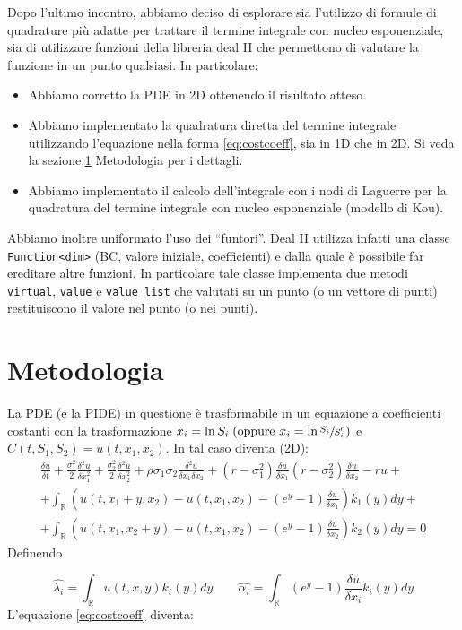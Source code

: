 \documentclass[a4paper,10pt]{article}
\newcommand{\der}[2]{\frac{\delta #1}{\delta #2}}
\newcommand{\dder}[2]{\frac{\delta^2 #1}{\delta #2^2}}
\newcommand{\dmix}[3]{\frac{\delta^2 #1}{\delta #2 \delta #3}}
\begin{document}
Dopo l'ultimo incontro, abbiamo deciso di esplorare sia l'utilizzo di formule di quadrature più adatte per trattare il termine integrale con nucleo esponenziale, sia di utilizzare funzioni della libreria deal II che permettono di valutare la funzione in un punto qualsiasi. In particolare:

\begin{itemize}
 \item Abbiamo corretto la PDE in 2D ottenendo il risultato atteso.
 \item Abbiamo implementato la quadratura diretta del termine integrale utilizzando l'equazione nella forma \eqref{eq:costcoeff}, sia in 1D che in 2D. Si veda la sezione \ref{sec:metod} Metodologia per i dettagli.
 \item Abbiamo implementato il calcolo dell'integrale con i nodi di Laguerre per la quadratura del termine integrale con nucleo esponenziale (modello di Kou).
\end{itemize}

Abbiamo inoltre uniformato l'uso dei ``funtori''. Deal II utilizza infatti una classe \verb!Function<dim>! (BC, valore iniziale, coefficienti) e dalla quale è possibile far ereditare altre funzioni. In particolare tale classe implementa due metodi \verb!virtual!, \verb!value! e \verb!value_list! che valutati su un punto (o un vettore di punti) restituiscono il valore nel punto (o nei punti). 

\section{Metodologia}
\label{sec:metod}
La PDE (e la PIDE) in questione è trasformabile in un equazione a coefficienti costanti con la trasformazione $x_i=\ln{S_i} \; (\text{oppure } x_i=\ln{\sfrac{S_i}{S_i^0}})$ e $C(t,S_1,S_2)=u(t,x_1,x_2)$. In tal caso diventa (2D):
{
\begin{multline}
 \der{u}{t}+\frac{\sigma_1^2}{2}\dder{u}{x_1}+\frac{\sigma_2^2}{2}\dder{u}{x_2}+\rho\sigma_1\sigma_2\dmix{u}{x_1}{x_2}+
 \left(r-\sigma_1^2\right)\der{u}{x_1}
 \left(r-\sigma_2^2\right)\der{u}{x_2}-ru+\\
 +\int_\mathbb{R}\left( u(t,x_1+y,x_2)-u(t,x_1,x_2)-(e^y-1)\der{u}{x_1}\right)k_1(y)dy+\\
 +\int_\mathbb{R}\left( u(t,x_1,x_2+y)-u(t,x_1,x_2)-(e^y-1)\der{u}{x_2}\right)k_2(y)dy=0
 \label{eq:costcoeff}
 \end{multline}
}
Definendo 

\begin{equation*}
 \hat{\lambda_i}=\int_\mathbb{R}u(t,x,y)k_i(y)dy \qquad \hat{\alpha_i}=\int_\mathbb{R}(e^y-1)\der{u}{x_i}k_i(y)dy
\end{equation*}
L'equazione \eqref{eq:costcoeff} diventa: 
\end{document}
